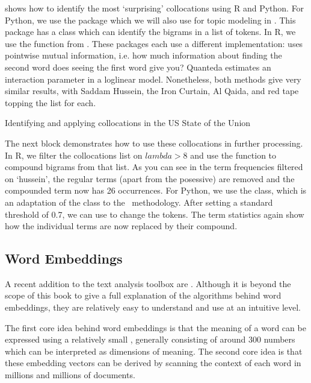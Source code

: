  shows how to identify the most `surprising' collocations using R and Python.
For Python, we use the  package which we will also use for topic modeling in .
This package has a  class which can identify the bigrams in a list of tokens.
In R, we use the  function from \quanteda.
These packages each use a different implementation:  uses pointwise mutual information, i.e.
how much information about finding the second word does seeing the first word give you?
Quanteda estimates an interaction parameter in a loglinear model.
Nonetheless, both methods give very similar results, with Saddam Hussein, the Iron Curtain, Al Qaida, and red tape topping the list for each.


\begin{ccsexample}
\caption{Identifying and applying collocations in the US State of the Union}\label{ex:colloc}
\end{ccsexample}


The next block demonstrates how to use these collocations in further processing.
In R, we filter the collocations list on $lambda>8$ and use the  function to compound bigrams from that list.
As you can see in the term frequencies filtered on `hussein', the regular terms (apart from the posessive) are removed and the compounded term now has 26 occurrences.
For Python, we use the  class, which is an adaptation of the  class to the \sklearn\ methodology.
After setting a standard threshold of 0.7, we can use  to change the tokens.
The term statistics again show how the individual terms are now replaced by their compound. 


\subsection{Word Embeddings}
\label{sec:wordembeddings}
A recent addition to the text analysis toolbox are .
Although it is beyond the scope of this book to give a full explanation of the algorithms behind word embeddings,
they are relatively easy to understand and use at an intuitive level.

The first core idea behind word embeddings is that the meaning of a word can be expressed using a relatively small , generally consisting of around 300 numbers which can be interpreted as dimensions of meaning.
The second core idea is that these embedding vectors can be derived by scanning the context of each word in millions and millions of documents.



